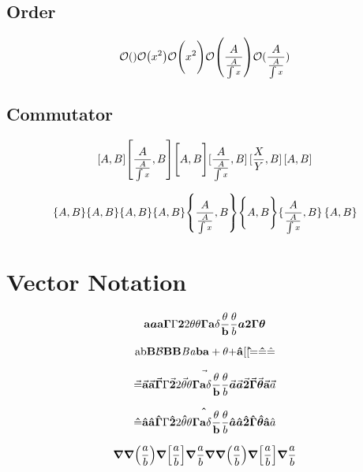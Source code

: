 \documentclass{article}
\begin{document}
\newpage
\subsection*{Order}

\[
  \order{}
  \order{x^2}
  \order\Bigg{x^2}
  \order{\frac{A}{\frac{A}{\int x}}}
  \order*{\frac{A}{\frac{A}{\int x}}}
\]

\subsection*{Commutator}

\[
  \comm{A}{B}
  \comm{\frac{A}{\frac{A}{\int x}}}{B}
  \comm\Bigg{A}{B}
  \comm*{\frac{A}{\frac{A}{\int x}}}{B}
  \comm*\Bigg{\frac{X}{Y}}{B}
  \comm{A}B
\]

\[
  \acomm{A}{B}
  \anticommutator{A}{B}
  \poissonbracket{A}{B}
  \pb{A}{B}
  \acomm{\frac{A}{\frac{A}{\int x}}}{B}
  \acomm\Bigg{A}{B}
  \acomm*{\frac{A}{\frac{A}{\int x}}}{B}
  \acomm{A}B
\]

\newpage

\section*{Vector Notation}

\[
  \vectorbold{a}
  \vectorbold*{a}
  \vb{a}
  \vb{\Gamma}\Gamma
  \vb{2}2
  \vb{\theta}
  \vb{\theta\Gamma a\delta \frac{\theta}{b}}\frac{\theta}{b}
  \vb*{a}
  \vb*{2}
  \vb*{\Gamma}
  \vb*{\theta}
\]


\[
  \vb{\mbox{ab}}
  \vb{B}
  \vb{\mathcal{B}}
  \mathcal{\vb{B}}
  \mathit{\vb{B}}
  \vb{\mathit{B}}
  \vb{\mathit{a}b}
  \vb{a+\theta}{\bf +}
  \vb{\hat{a}}
  \vb{[}[
  \vb{\hat{}}
  \vb{=}
  \vb{\hat{=}}\hat{=}
\]





\[
  \va{=}
  \vectorarrow{a}
  \va{a}
  \va{\Gamma}\Gamma
  \va{2}2
  \va{\theta}
  \va{\theta\Gamma a\delta \frac{\theta}{b}}\frac{\theta}{b}
  \vectorarrow*{a}
  \va*{a}
  \va*{2}
  \va*{\Gamma}
  \va*{\theta}
  \va{a}\vec{a}
\]


\[
  \vu{=}
  \vectorunit{a}
  \vu{a}
  \vu{\Gamma}\Gamma
  \vu{2}2
  \vu{\theta}
  \vu{\theta\Gamma a\delta \frac{\theta}{b}}\frac{\theta}{b}
  \vectorunit*{a}
  \vu*{a}
  \vu*{2}
  \vu*{\Gamma}
  \vu*{\theta}
  \vu{a}\hat{a}
\]


\[
  \gradient 
  \gradient(\frac{a}{b})
  \gradient[\frac{a}{b}]
  \gradient{\frac{a}{b}}
  \grad 
  \grad(\frac{a}{b})
  \grad[\frac{a}{b}]
  \grad{\frac{a}{b}}
\]
\end{document}
